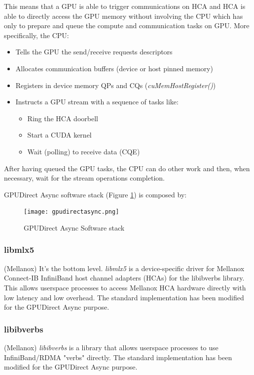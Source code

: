 \documentclass[conference]{IEEEtran}
\begin{document}
This means that a GPU is able to trigger communications on HCA and HCA is able to directly access the GPU memory without involving the CPU which has only to prepare and queue the compute and communication tasks on GPU.
More specifically, the CPU:
\begin{itemize}
\item Tells the GPU the send/receive requests descriptors
\item Allocates communication buffers (device or host pinned memory)
\item Registers in device memory QPs and CQs (\textit{cuMemHostRegister()})
\item Instructs a GPU stream with a sequence of tasks like:
	\begin{itemize}
		\item Ring the HCA doorbell
		\item Start a CUDA kernel
		\item Wait (polling) to receive data (CQE)
	\end{itemize}
\end{itemize}

After having queued the GPU tasks, the CPU can do other work and then, when necessary, wait for the stream operations completion.

GPUDirect Async software stack (Figure \ref{fig:gpudirectasync}) is composed by:

\begin{figure}[h]
\centering
\texttt{[image: gpudirectasync.png]}
\caption{GPUDirect Async Software stack}
\label{fig:gpudirectasync}
\end{figure}

\subsubsection{libmlx5}(Mellanox)
It's the bottom level. \emph{libmlx5} is a device-specific driver for Mellanox Connect-IB InfiniBand host channel adapters (HCAs) for the libibverbs library. This allows userspace processes to access Mellanox HCA hardware directly with low latency and low overhead.
The standard implementation has been modified for the GPUDirect Async purpose.

\subsubsection{libibverbs}(Mellanox)
\emph{libibverbs} is a library that allows userspace processes to use InfiniBand/RDMA "verbs" directly. The standard implementation has been modified for the GPUDirect Async purpose.
\end{document}
